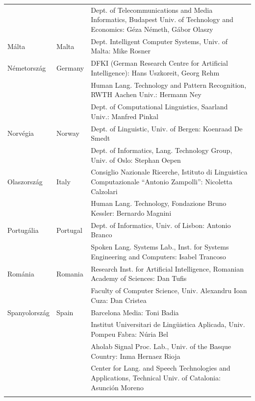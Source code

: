 \begin{longtable}{llp{105mm}}
    & & Dept. of Telecommunications and Media Informatics, Budapest Univ. of Technology and Economics: Géza Németh, Gábor Olaszy\\ \addlinespace
    Málta & \textcolor{grey1}{Malta} & Dept. Intelligent Computer Systems, Univ. of Malta: Mike Rosner\\ \addlinespace
    Németország & \textcolor{grey1}{Germany} & DFKI (German Research Centre for Artificial Intelligence): Hans Uszkoreit, Georg Rehm\\ \addlinespace
    & & Human Lang. Technology and Pattern Recognition, RWTH Aachen Univ.: Hermann Ney \\ \addlinespace
    & & Dept. of Computational Linguistics, Saarland Univ.: Manfred Pinkal\\ \addlinespace
    Norvégia & \textcolor{grey1}{Norway} & Dept. of Linguistic, Univ. of Bergen: Koenraad De Smedt\\ \addlinespace 
    & & Dept. of Informatics, Lang. Technology Group, Univ. of Oslo: Stephan Oepen \\ \addlinespace
    Olaszország & \textcolor{grey1}{Italy} & Consiglio Nazionale Ricerche, Istituto di Linguistica Computazionale “Antonio Zampolli”: Nicoletta Calzolari\\ \addlinespace
    & & Human Lang. Technology, Fondazione Bruno Kessler: Bernardo Magnini\\ \addlinespace
    Portugália & \textcolor{grey1}{Portugal} & Dept. of Informatics, Univ. of Lisbon: Antonio Branco\\ \addlinespace
    & & Spoken Lang. Systems Lab., Inst. for Systems Engineering and Computers: Isabel Trancoso \\ \addlinespace
    Románia & \textcolor{grey1}{Romania} & Research Inst. for Artificial Intelligence, Romanian Academy of Sciences: Dan Tufis \\ \addlinespace
    & & Faculty of Computer Science, Univ. Alexandru Ioan Cuza: Dan Cristea \\ \addlinespace
    Spanyolország & \textcolor{grey1}{Spain} & Barcelona Media: Toni Badia \\ \addlinespace 
    & & Institut Universitari de Lingüistica Aplicada, Univ. Pompeu Fabra: Núria Bel \\ \addlinespace 
    & & Aholab Signal Proc. Lab., Univ. of the Basque Country: Inma Hernaez Rioja \\ \addlinespace 
    & & Center for Lang. and Speech Technologies and Applications, Technical Univ. of Catalonia: Asunción Moreno \\ \addlinespace 

\end{longtable}

